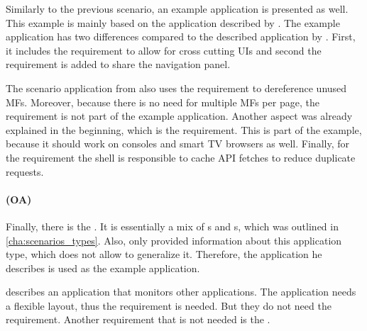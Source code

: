 Similarly to the previous scenario, an example application is presented as well.
This example is mainly based on the application described by \textciteMezzalira{}.
The example application has two differences compared to the described application by \citeauthorMezzalira{}.
First, it includes the  requirement to allow for cross cutting \acp{UI} and second the  requirement is added to share the navigation panel.

The scenario application from \textciteMezzalira{} also uses the  requirement to dereference unused \acp{MF}.
Moreover, because there is no need for multiple \acp{MF} per page, the  requirement is not part of the example application.
Another aspect was already explained in the beginning, which is the  requirement.
This is part of the example, because it should work on consoles and smart TV browsers as well.
Finally, for the  requirement the shell is responsible to cache \ac{API} fetches to reduce duplicate requests.



\paragraph{ (OA)}\label{cha:evaluation_offshelf}

Finally, there is the .
It is essentially a mix of s and s, which was outlined in \ref{cha:scenarios_types}.
Also, only \textcite{Grijzen.2019} provided information about this application type, which does not allow to generalize it.
Therefore, the application he describes is used as the example application.

\textcite{Grijzen.2019} describes an application that monitors other applications.
The application needs a flexible layout, thus the  requirement is needed.
But they do not need the  requirement.
Another requirement that is not needed is the .

